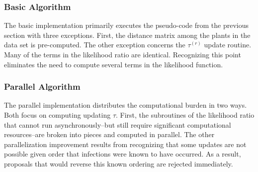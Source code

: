 \documentclass{uwstat572}
\begin{document}
\subsubsection{Basic Algorithm}
The basic implementation primarily executes the pseudo-code from the previous section with three exceptions.
First, the distance matrix among the plants in the data set is pre-computed. 
The other exception concerns the $\tau^{(r)}$ update routine. 
Many of the terms in the likelihood ratio are identical. 
Recognizing this point eliminates the need to compute several terms in the likelihood function. 
 
\subsubsection{Parallel Algorithm}
The parallel implementation distributes the computational burden in two ways. 
Both focus on computing updating $\tau$. 
First, the subroutines of the likelihood ratio that cannot run asynchronously--but still require significant computational resources--are broken into pieces and computed in parallel. 
The other parallelization improvement results from recognizing that some updates are not possible given order that infections were known to have occurred. 
As a result, proposals that would reverse this known ordering are rejected immediately. 
\end{document}
